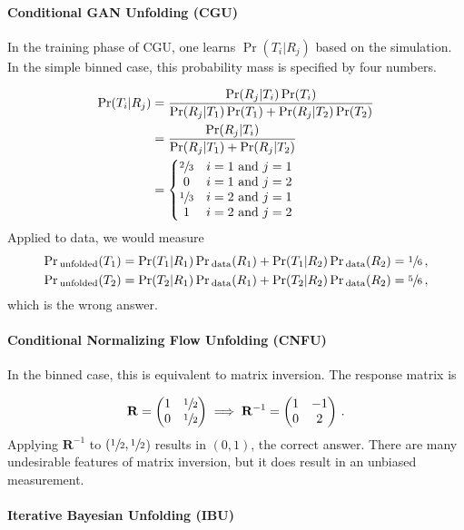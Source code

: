 \paragraph{Conditional GAN Unfolding (CGU)} In the training phase of CGU, one learns $\Pr(T_i|R_j)$ based on the simulation.  In the simple binned case, this probability mass is specified by four numbers.

\begin{align}
\Pr(T_i|R_j)&=\frac{\Pr(R_j|T_i)\Pr(T_i)}{\Pr(R_j|T_1)\Pr(T_1)+\Pr(R_j|T_2)\Pr(T_2)}\\
&=\frac{\Pr(R_j|T_i)}{\Pr(R_j|T_1)+\Pr(R_j|T_2)}\\
&=\left\{\begin{matrix}\sfrac{2}{3} & \text{$i=1$ and $j=1$} \cr 0 & \text{$i=1$ and $j=2$}  \cr \sfrac{1}{3}& \text{$i=2$ and $j=1$}  \cr 1& \text{$i=2$ and $j=2$}  \end{matrix}\right.
\end{align}
%
Applied to data, we would measure
%
\begin{align}
\Pr{}_\text{unfolded}(T_1)&=\Pr(T_1|R_1)\Pr{}_\text{data}(R_1)+\Pr(T_1|R_2)\Pr{}_\text{data}(R_2)=\sfrac{1}{6}\,,\\
\Pr{}_\text{unfolded}(T_2)&=\Pr(T_2|R_1)\Pr{}_\text{data}(R_1)+\Pr(T_2|R_2)\Pr{}_\text{data}(R_2)=\sfrac{5}{6}\,,
\end{align}
%
which is the wrong answer.

\paragraph{Conditional Normalizing Flow Unfolding (CNFU)} In the binned case, this is equivalent to matrix inversion.   The response matrix is

\begin{align}
\mathbf{R}=\begin{pmatrix} 1& \sfrac{1}{2}\cr 0 & \sfrac{1}{2}\end{pmatrix}\implies \mathbf{R}^{-1}=\begin{pmatrix} 1 & -1 \cr 0 & 2\end{pmatrix}\,.
\end{align}
%
Applying $\mathbf{R}^{-1}$ to $(\sfrac{1}{2},\sfrac{1}{2}$) results in $(0,1)$, the correct answer.  There are many undesirable features of matrix inversion, but it does result in an unbiased measurement.

\paragraph{Iterative Bayesian Unfolding (IBU)}

